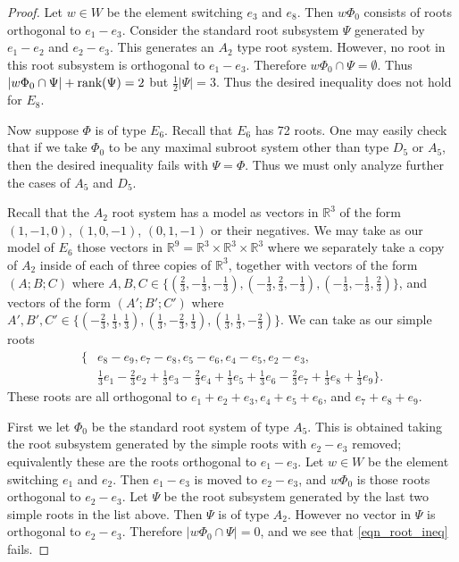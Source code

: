 \documentclass[12pt]{amsart}
\theoremstyle{remark}
\begin{document}
\begin{proof}
Let $w \in W$ be the element switching $e_3$ and $e_8$. Then $w \Phi_0$ consists of roots orthogonal to $e_1 - e_3$. Consider the standard root subsystem $\Psi$ generated by $e_1 - e_2$ and $e_2 - e_3$. This generates an $A_2$ type root system. However, no root in this root subsystem is orthogonal to $e_1 - e_3$. Therefore $w \Phi_0 \cap \Psi = \emptyset$. Thus $|w \Phi_0 \cap \Psi| + \textnormal{rank}(\Psi) = 2$ but $\frac{1}{2} |\Psi| = 3$. Thus the desired inequality does not hold for $E_8$.

Now suppose $\Phi$ is of type $E_6$. Recall that $E_6$ has 72 roots. One may easily check that if we take $\Phi_0$ to be any maximal subroot system other than type $D_5$ or $A_5$, then the desired inequality fails with $\Psi = \Phi$. Thus we must only analyze further the cases of $A_5$ and $D_5$.

Recall that the $A_2$ root system has a model as vectors in $\mathbb{R}^3$ of the form $(1,-1, 0)$, $(1, 0, -1)$, $(0, 1, -1)$ or their negatives. We may take as our model of $E_6$ those vectors in $\mathbb{R}^9 = \mathbb{R}^3 \times \mathbb{R}^3 \times \mathbb{R}^3$ where we separately take a copy of $A_2$ inside of each of three copies of $\mathbb{R}^3$, together with vectors of the form $(A; B; C)$ where $A, B, C \in \{(\frac{2}{3}, -\frac{1}{3}, -\frac{1}{3}), (-\frac{1}{3}, \frac{2}{3}, -\frac{1}{3}), (-\frac{1}{3}, -\frac{1}{3}, \frac{2}{3})\}$, and vectors of the form $(A'; B'; C')$ where $A', B', C' \in \{(-\frac{2}{3}, \frac{1}{3}, \frac{1}{3}), (\frac{1}{3}, -\frac{2}{3}, \frac{1}{3}), (\frac{1}{3}, \frac{1}{3}, -\frac{2}{3})\}$. We can take as our simple roots
\begin{align*}
   \{ & e_8 - e_9, e_7 - e_8, e_5 - e_6, e_4 - e_5, e_2 - e_3, \\
   &\frac{1}{3}e_1 - \frac{2}{3} e_2 + \frac{1}{3} e_3 - \frac{2}{3} e_4 + \frac{1}{3} e_5 + \frac{1}{3} e_6 - \frac{2}{3} e_7 + \frac{1}{3} e_8 + \frac{1}{3} e_9 \}.
\end{align*}
These roots are all orthogonal to $e_1 + e_2 + e_3, e_4 + e_5 + e_6$, and $e_7 + e_8 + e_9$.

First we let $\Phi_0$ be the standard root system of type $A_5$. This is obtained taking the root subsystem generated by the simple roots with $e_2 - e_3$ removed; equivalently these are the roots orthogonal to $e_1 - e_3$. Let $w \in W$ be the element switching $e_1$ and $e_2$. Then $e_1 - e_3$ is moved to $e_2 - e_3$, and $w \Phi_0$ is those roots orthogonal to $e_2 - e_3$. Let $\Psi$ be the root subsystem generated by the last two simple roots in the list above. Then $\Psi$ is of type $A_2$. However no vector in $\Psi$ is orthogonal to $e_2 - e_3$. Therefore $|w \Phi_0 \cap \Psi| = 0$, and we see that \eqref{eqn_root_ineq} fails.


\end{proof}
\end{document}
